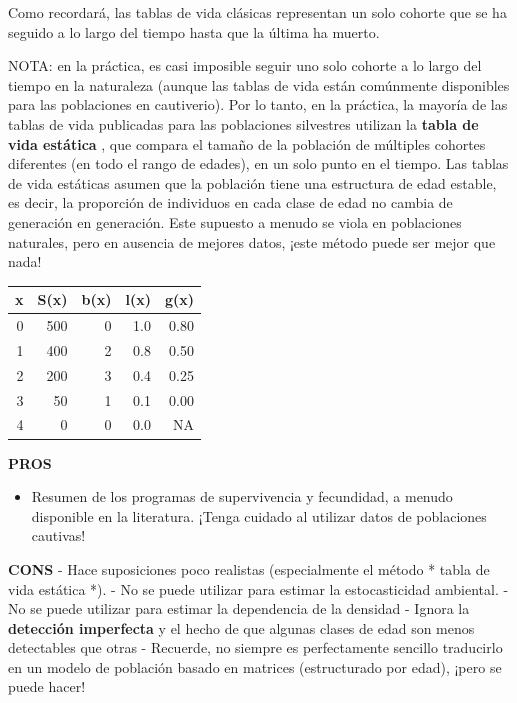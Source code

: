\documentclass[
]{article}
\providecommand{\tightlist}{%
  \setlength{\itemsep}{0pt}\setlength{\parskip}{0pt}}
\begin{document}
Como recordará, las tablas de vida clásicas representan un solo cohorte
que se ha seguido a lo largo del tiempo hasta que la última ha muerto.

NOTA: en la práctica, es casi imposible seguir uno solo cohorte a lo
largo del tiempo en la naturaleza (aunque las tablas de vida están
comúnmente disponibles para las poblaciones en cautiverio). Por lo
tanto, en la práctica, la mayoría de las tablas de vida publicadas para
las poblaciones silvestres utilizan la \textbf{tabla de vida estática },
que compara el tamaño de la población de múltiples cohortes diferentes
(en todo el rango de edades), en un solo punto en el tiempo. Las tablas
de vida estáticas asumen que la población tiene una estructura de edad
estable, es decir, la proporción de individuos en cada clase de edad no
cambia de generación en generación. Este supuesto a menudo se viola en
poblaciones naturales, pero en ausencia de mejores datos, ¡este método
puede ser mejor que nada!

\begin{longtable}[]{@{}rrrrr@{}}
\toprule
x & S(x) & b(x) & l(x) & g(x) \\
\midrule
\endhead
0 & 500 & 0 & 1.0 & 0.80 \\
1 & 400 & 2 & 0.8 & 0.50 \\
2 & 200 & 3 & 0.4 & 0.25 \\
3 & 50 & 1 & 0.1 & 0.00 \\
4 & 0 & 0 & 0.0 & NA \\
\bottomrule
\end{longtable}

\textbf{PROS}

\begin{itemize}
\tightlist
\item
  Resumen de los programas de supervivencia y fecundidad, a menudo
  disponible en la literatura. ¡Tenga cuidado al utilizar datos de
  poblaciones cautivas!
\end{itemize}

\textbf{CONS} - Hace suposiciones poco realistas (especialmente el
método * tabla de vida estática *). - No se puede utilizar para estimar
la estocasticidad ambiental. - No se puede utilizar para estimar la
dependencia de la densidad - Ignora la \textbf{ detección imperfecta } y
el hecho de que algunas clases de edad son menos detectables que otras -
Recuerde, no siempre es perfectamente sencillo traducirlo en un modelo
de población basado en matrices (estructurado por edad), ¡pero se puede
hacer!
\end{document}

